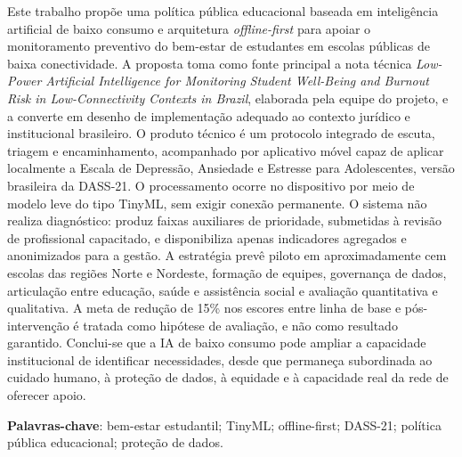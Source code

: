 \documentclass[
  12pt,
  openright,
  oneside,
  a4paper,
  english,
  brazil
]{abntex2}
\begin{document}
\begin{resumo}
Este trabalho propõe uma política pública educacional baseada em inteligência
artificial de baixo consumo e arquitetura \emph{offline-first} para apoiar o
monitoramento preventivo do bem-estar de estudantes em escolas públicas de
baixa conectividade. A proposta toma como fonte principal a nota técnica
\emph{Low-Power Artificial Intelligence for Monitoring Student Well-Being and
Burnout Risk in Low-Connectivity Contexts in Brazil}, elaborada pela equipe do
projeto, e a converte em desenho de implementação adequado ao
contexto jurídico e institucional brasileiro. O produto técnico é um protocolo
integrado de escuta, triagem e encaminhamento, acompanhado por aplicativo móvel
capaz de aplicar localmente a Escala de Depressão, Ansiedade e Estresse para
Adolescentes, versão brasileira da DASS-21. O processamento ocorre no
dispositivo por meio de modelo leve do tipo TinyML, sem exigir conexão
permanente. O sistema não realiza diagnóstico: produz faixas auxiliares de
prioridade, submetidas à revisão de profissional capacitado, e disponibiliza
apenas indicadores agregados e anonimizados para a gestão. A estratégia prevê
piloto em aproximadamente cem escolas das regiões Norte e Nordeste, formação de
equipes, governança de dados, articulação entre educação, saúde e assistência
social e avaliação quantitativa e qualitativa. A meta de redução de 15\% nos
escores entre linha de base e pós-intervenção é tratada como hipótese de
avaliação, e não como resultado garantido. Conclui-se que a IA de baixo consumo
pode ampliar a capacidade institucional de identificar necessidades, desde que
permaneça subordinada ao cuidado humano, à proteção de dados, à equidade e à
capacidade real da rede de oferecer apoio.

\vspace{\onelineskip}
\noindent
\textbf{Palavras-chave}: bem-estar estudantil; TinyML; offline-first; DASS-21;
política pública educacional; proteção de dados.
\end{resumo}
\end{document}
